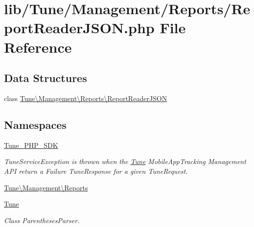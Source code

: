 \hypertarget{ReportReaderJSON_8php}{\section{lib/\-Tune/\-Management/\-Reports/\-Report\-Reader\-J\-S\-O\-N.php File Reference}
\label{ReportReaderJSON_8php}
}
\subsection*{Data Structures}
\begin{DoxyCompactItemize}
\item 
class \hyperlink{classTune_1_1Management_1_1Reports_1_1ReportReaderJSON}{Tune\textbackslash{}\-Management\textbackslash{}\-Reports\textbackslash{}\-Report\-Reader\-J\-S\-O\-N}
\end{DoxyCompactItemize}
\subsection*{Namespaces}
\begin{DoxyCompactItemize}
\item 
\hyperlink{namespaceTune__PHP__SDK}{Tune\-\_\-\-P\-H\-P\-\_\-\-S\-D\-K}
\begin{DoxyCompactList}\small\item\em Tune\-Service\-Exception is thrown when the \hyperlink{namespaceTune}{Tune} Mobile\-App\-Tracking Management A\-P\-I return a Failure Tune\-Response for a given Tune\-Request. \end{DoxyCompactList}\item 
\hyperlink{namespaceTune_1_1Management_1_1Reports}{Tune\textbackslash{}\-Management\textbackslash{}\-Reports}
\item 
\hyperlink{namespaceTune}{Tune}
\begin{DoxyCompactList}\small\item\em Class Parentheses\-Parser. \end{DoxyCompactList}\end{DoxyCompactItemize}
